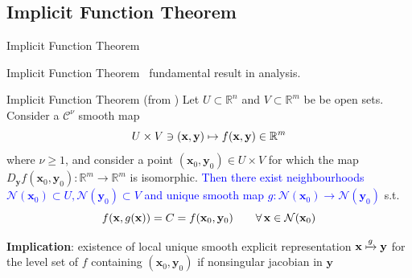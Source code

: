 \documentclass[11pt]{beamer}
\begin{document}
\begin{frame}{\section{Implicit Function Theorem}Implicit Function Theorem}
    Implicit Function Theorem \textemdash\, fundamental result in analysis.
    \begin{block}{Implicit Function Theorem (from \cite[Theorem 4.B]{zeidler2013vol1}\footnotemark[3])}\label{thm:imft}
        Let \(U\subset\mathbb{R}^n\) and \(V\subset\mathbb{R}^m\) be be open sets. Consider a \(\mathcal{C}^{\nu}\) smooth map
        \vspace{-2mm}\[
            U\times V\ni(\mathbf{x},\mathbf{y})\mapsto f(\mathbf{x},\mathbf{y})\in\mathbb{R}^m
        \vspace{-2mm}\]
        where \(\nu\geq1\), {and consider} a point \((\mathbf{x}_0,\mathbf{y}_0)\in U\times V\) for which the map \(D_{\mathbf{y}}f(\mathbf{x}_0,\mathbf{y}_0):\mathbb{R}^m\to\mathbb{R}^m\) is isomorphic. \textcolor{blue}{Then there exist neighbourhoods \({\mathcal{N}}(\mathbf{x}_0)\subset U, \mathcal{N}(\mathbf{y}_0)\subset V\) and unique smooth map \(g:{\mathcal{N}}(\mathbf{x}_0)\to{\mathcal{N}}(\mathbf{y}_0)\)} s.t.
        \vspace{-2mm}\[
            f(\mathbf{x},g(\mathbf{x})) = C = f(\mathbf{x}_0,\mathbf{y}_0)\qquad\forall\,\mathbf{x}\in{\mathcal{N}}(\mathbf{x}_0) \label{eq:imft}
        \vspace{+1mm}\]
    \end{block}
    \alert{\textbf{Implication}: existence of local unique smooth explicit representation \(\mathbf{x}\xmapsto{g}\mathbf{y}\) for the level set of \(f\) containing \((\mathbf{x}_0,\mathbf{y}_0)\) if nonsingular jacobian in \(\mathbf{y}\)}\\\vspace{1mm}
\end{frame}
\end{document}
